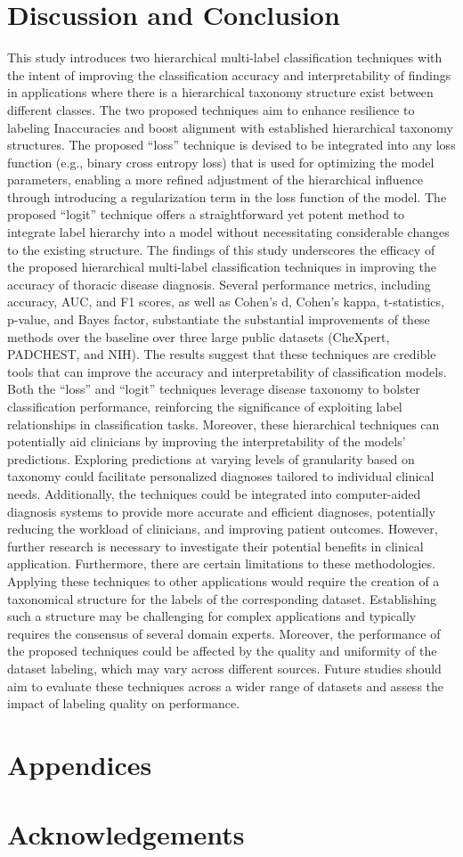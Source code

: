 \section{Discussion and Conclusion}\label{sec:taxonomy.discussion}
This study introduces two hierarchical multi-label classification techniques with the intent of improving the classification accuracy and interpretability of findings in applications where there is a hierarchical taxonomy structure exist between different classes. The two proposed techniques aim to enhance resilience to labeling Inaccuracies and boost alignment with established hierarchical taxonomy structures. The proposed ``loss'' technique is devised to be integrated into any loss function (e.g., binary cross entropy loss) that is used for optimizing the model parameters, enabling a more refined adjustment of the hierarchical influence through introducing a regularization term in the loss function of the model. The proposed ``logit'' technique offers a straightforward yet potent method to integrate label hierarchy into a model without necessitating considerable changes to the existing structure.
%
The findings of this study underscores the efficacy of the proposed hierarchical multi-label classification techniques in improving the accuracy of thoracic disease diagnosis. Several performance metrics, including accuracy, AUC, and F1 scores, as well as Cohen's d, Cohen's kappa, t-statistics, p-value, and Bayes factor, substantiate the substantial improvements of these methods over the baseline over three large public datasets (CheXpert, PADCHEST, and NIH). The results suggest that these techniques are credible tools that can improve the accuracy and interpretability of classification models.
%
Both the ``loss'' and ``logit'' techniques leverage disease taxonomy to bolster classification performance, reinforcing the significance of exploiting label relationships in classification tasks. Moreover, these hierarchical techniques can potentially aid clinicians by improving the interpretability of the models' predictions. Exploring predictions at varying levels of granularity based on taxonomy could facilitate personalized diagnoses tailored to individual clinical needs.  Additionally, the techniques could be integrated into computer-aided diagnosis systems to provide more accurate and efficient diagnoses, potentially reducing the workload of clinicians, and improving patient outcomes.
%
However, further research is necessary to investigate their potential benefits in clinical application. Furthermore, there are certain limitations to these methodologies. Applying these techniques to other applications would require the creation of a taxonomical structure for the labels of the corresponding dataset. Establishing such a structure may be challenging for complex applications and typically requires the consensus of several domain experts. Moreover, the performance of the proposed techniques could be affected by the quality and uniformity of the dataset labeling, which may vary across different sources. Future studies should aim to evaluate these techniques across a wider range of datasets and assess the impact of labeling quality on performance.
%
\section*{Appendices}
\section*{Acknowledgements}


